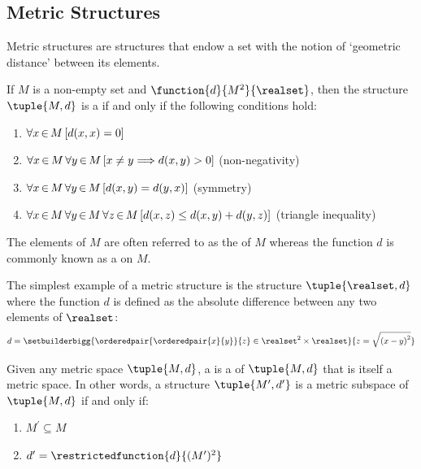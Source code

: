 \subsection{Metric Structures}

Metric structures are structures that endow a set with the notion of `geometric distance' between its elements.

\begin{dfn}[Metric]
     \label{dfn:metric-space}
    If \( M \) is a non-empty set and \( \function{d}{M^{2}}{\realset} \),
    then the structure \( \tuple{M, d} \) is a  if and only if
    the following conditions hold:
    \begin{enumerate}[topsep=3pt,itemsep=2pt,label=\textup{\texttt{(\alph*)}}]
        \item \( \forall x\,{\in}\,M \, \mleft[ d(x,x) = 0 \mright] \)
        \item \( \forall x\,{\in}\,M \, \forall y\,{\in}\,M \, \mleft[ x \neq y {\implies} d(x,y) > 0 \mright] \) \textup{(non-negativity)}
        \item \( \forall x\,{\in}\,M \, \forall y\,{\in}\,M \, \mleft[ d(x,y) = d(y,x) \mright] \) \textup{(symmetry)}
        \item \( \forall x\,{\in}\,M \, \forall y\,{\in}\,M \, \forall z\,{\in}\,M \, \mleft[ d(x,z) \leq d(x,y) + d(y,z) \mright] \)
            \textup{(triangle inequality)}
    \end{enumerate}

    \vspace{0.1cm}
    \noindent
    The elements of \( M \) are often referred to as the  of \( M \) whereas the function \( d \) is commonly known as 
    a  on \( M \).
\end{dfn}

\noindent
The simplest example of a metric structure is the structure \( \tuple{\realset, d} \) where the function \( d \) is defined as the absolute difference between any
two elements of \( \realset \):
\begin{equation*}
    d = \setbuilderbigg{\orderedpair{\orderedpair{x}{y}}{z} \in \realset^{2} \times \realset }{
        z = \sqrt{\mleft( x - y \mright)^{2}}
    }
\end{equation*}

\begin{dfn}[Subspace]
     \label{dfn:metric-subspace}
    Given any metric space \( \tuple{M, d} \), a  is a 
    of \( \tuple{M, d} \) that is itself a metric space.
    In other words, a structure \( \tuple{M^{\prime}, d^{\prime}} \) is a metric subspace of \( \tuple{M, d} \) if and only if:
    \begin{enumerate}[topsep=2pt,label=\textup{\texttt{(\alph*)}}]
        \item \( M^{\prime} \subseteq M \)
        \item \( d^{\prime} = \restrictedfunction{d}{(M^{\prime})^{2}} \)
    \end{enumerate}
\end{dfn}

